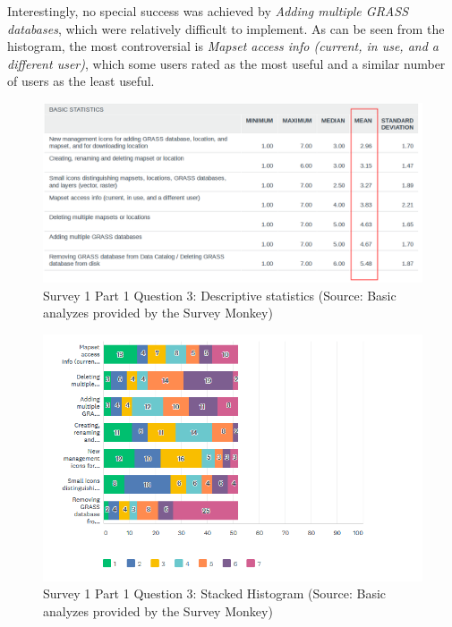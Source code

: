 \documentclass[a4paper,10pt,twoside]{article}
\begin{document}
Interestingly, no special success was achieved by \textit{Adding multiple GRASS databases}, which were relatively difficult to implement. As can be seen from the histogram, the most controversial is \textit{Mapset access info (current, in use, and a different user)}, which some users rated as the most useful and a similar number of users as the least useful.

\vspace{0.3cm}
\begin{figure}[hbt!] 
\begin{center}
\includegraphics[width=17cm]{../surveys/analyzed_data/survey1_part1_question3_descriptive_stats_sm.png} 
\caption[Survey 1 Part 1 Question 3: Descriptive statistics]{Survey 1 Part 1 Question 3: Descriptive statistics (Source: Basic analyzes provided by the Survey Monkey)}
\label{fig:survey1_part1_question3_descriptive_stats_sm}
\end{center}
\end{figure}

\vspace{0.3cm}
\begin{figure}[hbt!] 
\begin{center}
\includegraphics[width=17cm]{../surveys/analyzed_data/survey1_part1_question3_histogram.png} 
\caption[Survey 1 Part 1 Question 3: Stacked Histogram]{Survey 1 Part 1 Question 3: Stacked Histogram (Source: Basic analyzes provided by the Survey Monkey)}
\label{fig:survey1_part1_question3_histogram}
\end{center}
\end{figure}
\end{document}
